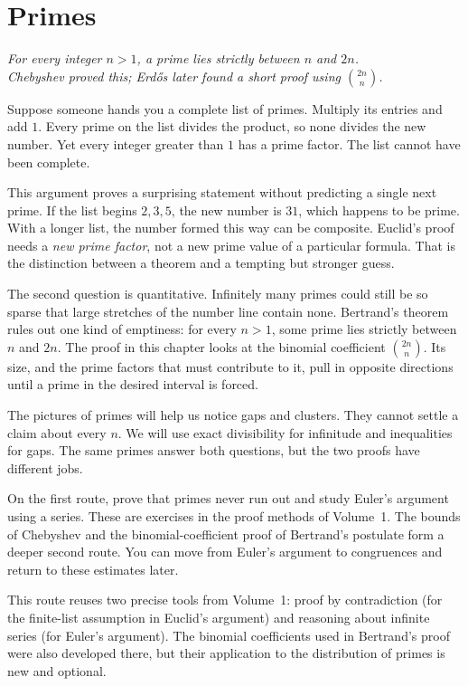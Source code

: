 \chapter{Primes}\label{ch:primes}

\begin{center}\itshape
For every integer $n>1$, a prime lies strictly between $n$ and $2n$.\\
Chebyshev proved this; Erd\H{o}s later found a short proof using $\binom{2n}n$.
\end{center}


Suppose someone hands you a complete list of primes. Multiply its entries and add $1$. Every prime on the list divides the product, so none divides the new number. Yet every integer greater than $1$ has a prime factor. The list cannot have been complete.

This argument proves a surprising statement without predicting a single next prime. If the list begins $2,3,5$, the new number is $31$, which happens to be prime. With a longer list, the number formed this way can be composite. Euclid's proof needs a \emph{new prime factor}, not a new prime value of a particular formula. That is the distinction between a theorem and a tempting but stronger guess.

The second question is quantitative. Infinitely many primes could still be so sparse that large stretches of the number line contain none. Bertrand's theorem rules out one kind of emptiness: for every $n>1$, some prime lies strictly between $n$ and $2n$. The proof in this chapter looks at the binomial coefficient $\binom{2n}{n}$. Its size, and the prime factors that must contribute to it, pull in opposite directions until a prime in the desired interval is forced.

The pictures of primes will help us notice gaps and clusters. They cannot settle a claim about every $n$. We will use exact divisibility for infinitude and inequalities for gaps. The same primes answer both questions, but the two proofs have different jobs.

\begin{reminder}
On the first route, prove that primes never run out and study Euler's argument using a series. These are exercises in the proof methods of Volume~1. The bounds of Chebyshev and the binomial-coefficient proof of Bertrand's postulate form a deeper second route. You can move from Euler's argument to congruences and return to these estimates later.

This route reuses two precise tools from Volume~1: proof by contradiction
(for the finite-list assumption in Euclid's argument) and reasoning
about infinite series (for Euler's argument). The binomial coefficients
used in Bertrand's proof were also developed there, but their
application to the distribution of primes is new and optional.
\end{reminder}


